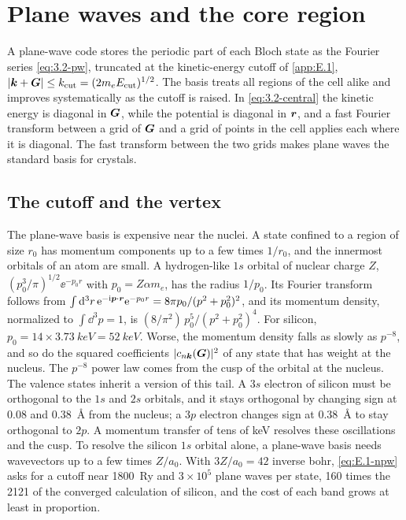 \section{Plane waves and the core region}\label{sec:3.5}

A plane-wave code stores the periodic part of each Bloch state as the Fourier series \cref{eq:3.2-pw}, truncated at the kinetic-energy cutoff of \cref{app:E.1}, $|\bm{k}+\bm{G}| \le k_{\mathrm{cut}} = (2m_eE_{\mathrm{cut}})^{1/2}$. The basis treats all regions of the cell alike and improves systematically as the cutoff is raised. In \cref{eq:3.2-central} the kinetic energy is diagonal in $\bm{G}$, while the potential is diagonal in $\bm{r}$, and a fast Fourier transform between a grid of $\bm{G}$ and a grid of points in the cell applies each where it is diagonal. The fast transform between the two grids makes plane waves the standard basis for crystals.

\subsection{The cutoff and the vertex}

The plane-wave basis is expensive near the nuclei. A state confined to a region of size $r_0$ has momentum components up to a few times $1/r_0$, and the innermost orbitals of an atom are small. A hydrogen-like $1s$ orbital of nuclear charge $Z$, $(p_0^3/\pi)^{1/2}\ee^{-p_0r}$ with $p_0 = Z\alpha m_e$, has the radius $1/p_0$. Its Fourier transform follows from $\int\mathrm{d}^3r\,\mathrm{e}^{-\mathrm{i}\bm{p}\cdot\bm{r}}\mathrm{e}^{-p_0r} = 8\pi p_0/(p^2 + p_0^2)^2$, and its momentum density, normalized to $\int\dd^3p = 1$, is $(8/\pi^2)\,p_0^5/(p^2 + p_0^2)^4$. For silicon, $p_0 = 14\times\SI{3.73}{keV} = \SI{52}{keV}$. Worse, the momentum density falls as slowly as $p^{-8}$, and so do the squared coefficients $|c_{n\bm{k}}(\bm{G})|^2$ of any state that has weight at the nucleus. The $p^{-8}$ power law comes from the cusp of the orbital at the nucleus. The valence states inherit a version of this tail. A $3s$ electron of silicon must be orthogonal to the $1s$ and $2s$ orbitals, and it stays orthogonal by changing sign at 0.08 and \SI{0.38}{\angstrom} from the nucleus; a $3p$ electron changes sign at \SI{0.38}{\angstrom} to stay orthogonal to $2p$. A momentum transfer of tens of keV resolves these oscillations and the cusp. To resolve the silicon $1s$ orbital alone, a plane-wave basis needs wavevectors up to a few times $Z/a_0$. With $3Z/a_0 = 42$ inverse bohr, \cref{eq:E.1-npw} asks for a cutoff near \SI{1800}{Ry} and $3\times10^5$ plane waves per state, 160 times the 2121 of the converged calculation of silicon, and the cost of each band grows at least in proportion.

